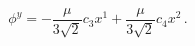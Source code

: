 \begin{equation}
\phi^{y}=-\textstyle{\frac{\mu}{3\sqrt{2}}}c_{3}x^{1}+\textstyle{\frac{\mu}{3\sqrt{2}}}c_{4}x^{2}\,.\label{tilt}
\end{equation}

